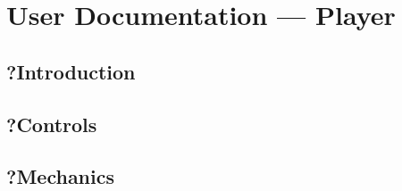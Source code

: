 \chapter{User Documentation --- Player}

\section{?Introduction}

\section{?Controls}

\section{?Mechanics}
